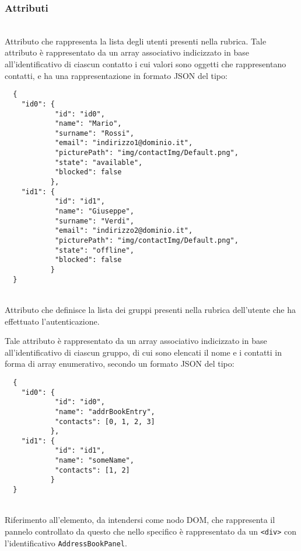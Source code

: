 \subsubsection*{Attributi}
\begin{description}
  
   \item{}\\
  Attributo che rappresenta la lista degli utenti presenti nella rubrica. Tale attributo è rappresentato da un array associativo indicizzato in base all'identificativo di ciascun contatto i cui valori sono oggetti che rappresentano contatti, e ha una rappresentazione in formato JSON del tipo:
  \begin{verbatim}
  {
  	"id0": {
  	        "id": "id0",
  	        "name": "Mario",
  	        "surname": "Rossi",
            "email": "indirizzo1@dominio.it",
            "picturePath": "img/contactImg/Default.png",
            "state": "available",
            "blocked": false
  	       },
  	"id1": {
  	        "id": "id1",
  	        "name": "Giuseppe",
  	        "surname": "Verdi",
            "email": "indirizzo2@dominio.it",
            "picturePath": "img/contactImg/Default.png",
            "state": "offline",
            "blocked": false
  	       }
  }
  \end{verbatim}
  
   \item{}\\
  Attributo che definisce la lista dei gruppi presenti nella rubrica dell'utente che ha effettuato l'autenticazione.
  
  Tale attributo è rappresentato da un array associativo indicizzato in base all'identificativo di ciascun gruppo, di cui sono elencati il nome e i contatti in forma di array enumerativo, secondo un formato JSON del tipo:
  \begin{verbatim}
  {
  	"id0": {
  	        "id": "id0",
  	        "name": "addrBookEntry",
  	        "contacts": [0, 1, 2, 3]
  	       },
  	"id1": {
  	        "id": "id1",
  	        "name": "someName",
  	        "contacts": [1, 2]
  	       }
  }
  \end{verbatim}
  
   \item{}\\
  Riferimento all'elemento, da intendersi come nodo DOM, che rappresenta il pannelo controllato da questo  che nello specifico è rappresentato da un \verb'<div>' con l'identificativo \verb'AddressBookPanel'.
  
\end{description}

